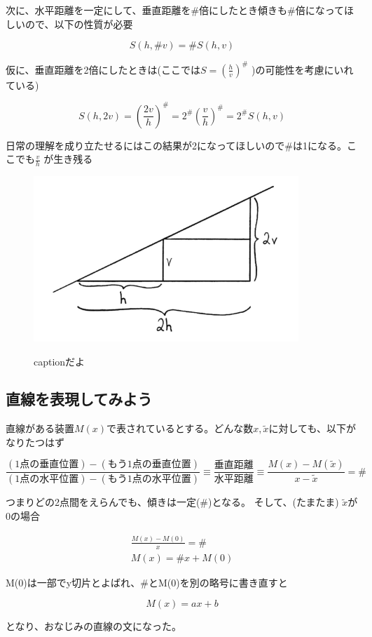 \documentclass[dvipdfmx]{jsarticle}
\begin{document}
次に、水平距離を一定にして、垂直距離を\#倍にしたとき傾きも\#倍になってほしいので、以下の性質が必要

\[ S(h,\#v) = \#S(h,v) \]

仮に、垂直距離を2倍にしたときは(ここでは$S = (\frac{h}{v})^\#$ )の可能性を考慮にいれている)

\[ S(h,2v) = (\frac{2v}{h})^\#  = 2^\#(\frac{v}{h})^\# = 2^\#S(h,v) \]

日常の理解を成り立たせるにはこの結果が2になってほしいので\#は1になる。ここでも$\frac{v}{h}$ が生き残る


\begin{figure}
  \centering
  \includegraphics[width=10cm]{images/burn_math_1-8.png}
  \label{fig:1-8}
  \caption{captionだよ}
\end{figure}

\subsection{直線を表現してみよう}

直線がある装置$M(x)$で表されているとする。どんな数$x, \tilde{x}$に対しても、以下がなりたつはず

\[ \frac{(1点の垂直位置) - (もう1点の垂直位置)}{(1点の水平位置) - (もう1点の水平位置)} \equiv \frac{垂直距離}{水平距離} \equiv \frac{M(x) - M(\tilde{x})}{x - \tilde{x}}  = \# \]

つまりどの2点間をえらんでも、傾きは一定(\#)となる。 そして、(たまたま) $\tilde{x}$が0の場合

\begin{align*}
  \frac{M(x) - M(0)}{x} = \# \\
  M(x) = \#x + M(0)
\end{align*}

M(0)は一部でy切片とよばれ、\#とM(0)を別の略号に書き直すと

\[ M(x) = ax + b \]

となり、おなじみの直線の文になった。
\end{document}
